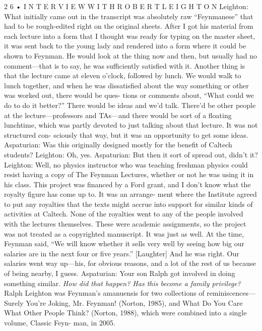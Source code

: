 \documentclass[11pt,oneside]{article}
\begin{document}
2 6 • I N T E R V I E W  W I T H  R O B E R T  L E I G H T O N Leighton: What initially came out in the transcript was absolutely raw “Feynmanese” that had to be rough-edited right on the original sheets. After I got his material from each lecture into a form that I thought was ready for typing on the master sheet, it was sent back to the young lady and rendered into a form where it could be shown to Feynman. He would look at the thing now and then, but usually had no comment---that is to say, he was sufficiently satisfied with it. Another thing is that the lecture came at eleven o’clock, followed by lunch. We would walk to lunch together, and when he was dissatisfied about the way something or other was worked out, there would be ques- tions or comments about, “What could we do to do it better?” There would be ideas and we’d talk. There’d be other people at the lecture---professors and TAs---and there would be sort of a floating lunchtime, which was partly devoted to just talking about that lecture. It was not structured con- sciously that way, but it was an opportunity to get some ideas. Aspaturian: Was this originally designed mostly for the benefit of Caltech students? Leighton: Oh, yes. Aspaturian: But then it sort of spread out, didn’t it? Leighton: Well, no physics instructor who was teaching freshman physics could resist having a copy of The Feynman Lectures, whether or not he was using it in his class. This project was financed by a Ford grant, and I don’t know what the royalty figure has come up to. It was an arrange- ment where the Institute agreed to put any royalties that the texts might accrue into support for similar kinds of activities at Caltech. None of the royalties went to any of the people involved with the lectures themselves. These were academic assignments, so the project was not treated as a copyrighted manuscript. It was just as well. At the time, Feynman said, “We will know whether it sells very well by seeing how big our salaries are in the next four or five years.” [Laughter] And he was right. Our salaries went way up---his, for obvious reasons, and a lot of the rest of us because of being nearby, I guess. Aspaturian: Your son Ralph got involved in doing something similar.\emph{ How did that happen? Has this become a family privilege? } Ralph Leighton was Feynman’s amanuensis for two collections of reminiscences--- Surely You’re Joking, Mr. Feynman! (Norton, 1985), and What Do You Care What Other People Think? (Norton, 1988), which were combined into a single volume, Classic Feyn- man, in 2005.\par
\end{document}
